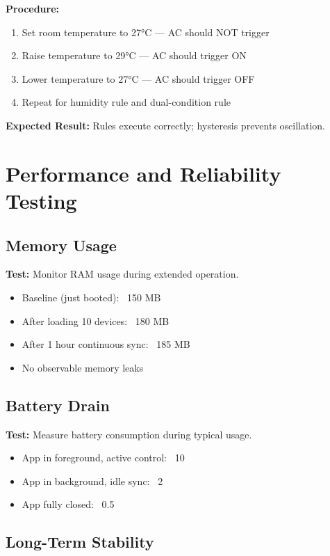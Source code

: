 \textbf{Procedure:}
\begin{enumerate}
    \item Set room temperature to 27°C — AC should NOT trigger
    \item Raise temperature to 29°C — AC should trigger ON
    \item Lower temperature to 27°C — AC should trigger OFF
    \item Repeat for humidity rule and dual-condition rule
\end{enumerate}

\textbf{Expected Result:} Rules execute correctly; hysteresis prevents oscillation.

\section{Performance and Reliability Testing}

\subsection{Memory Usage}

\textbf{Test:} Monitor RAM usage during extended operation.

\begin{itemize}
    \item Baseline (just booted): ~150 MB
    \item After loading 10 devices: ~180 MB
    \item After 1 hour continuous sync: ~185 MB
    \item No observable memory leaks
\end{itemize}

\subsection{Battery Drain}

\textbf{Test:} Measure battery consumption during typical usage.

\begin{itemize}
    \item App in foreground, active control: ~10%
    \item App in background, idle sync: ~2%
    \item App fully closed: ~0.5%
\end{itemize}

\subsection{Long-Term Stability}


